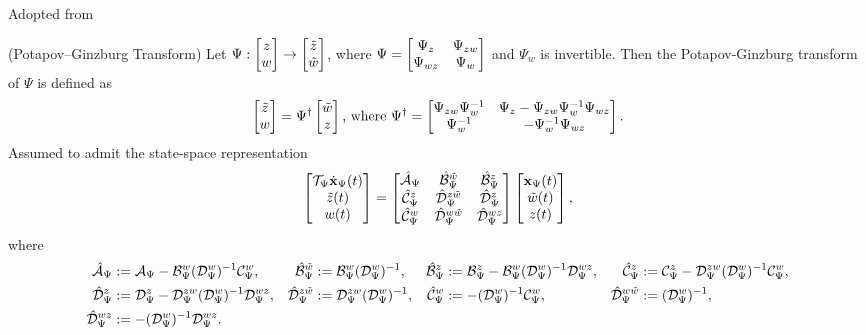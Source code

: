 Adopted from \cite{venkataraman}
\begin{definition}(Potapov--Ginzburg Transform)\label{def:pg}
    Let ${\Psi} : \begin{bmatrix}z \\ w\end{bmatrix} \to \begin{bmatrix}\tilde{z} \\ \tilde{w}\end{bmatrix}$, where $\Psi = \begin{bmatrix}\Psi_{z} & \Psi_{zw} \\ \Psi_{wz} & \Psi_{w}\end{bmatrix}$
    and $\Psi_{w}$ is invertible. Then the Potapov-Ginzburg transform of $\Psi$ is defined as
    \begin{equation}\label{eqn:pgtransform}
        \begin{bmatrix}\tilde{z} \\ w\end{bmatrix}= \Psi^\dagger \begin{bmatrix}\tilde{w} \\ z\end{bmatrix} \text{, where }\Psi^\dagger = \begin{bmatrix}\Psi_{zw}\Psi_{w}^{-1} & \Psi_{z} - \Psi_{zw}\Psi_{w}^{-1}\Psi_{wz}\\
                            \Psi_{w}^{-1} & -\Psi_{w}^{-1}\Psi_{wz}\end{bmatrix}.
    \end{equation}
    Assumed to admit the state-space representation
    \begin{equation}\label{eqn:sspgtransform}
        \begin{bmatrix}\mathcal{T}_\Psi\dot{\mathbf{x}}_\Psi(t)\\ \tilde{z}(t) \\ w(t)\end{bmatrix} = 
        \begin{bmatrix}\hat{\mathcal{A}}_\Psi & \hat{\mathcal{B}}_\Psi^{\tilde{w}} & \hat{\mathcal{B}}_\Psi^z\\
        \hat{\mathcal{C}}_\Psi^z & \hat{\mathcal{D}}_\Psi^{z\tilde{w}} & \hat{\mathcal{D}}_\Psi^z \\
        \hat{\mathcal{C}}_\Psi^w & \hat{\mathcal{D}}_\Psi^{w\tilde{w}} & \hat{\mathcal{D}}_\Psi^{wz}\end{bmatrix}\begin{bmatrix}\mathbf{x}_\Psi(t) \\ \tilde{w}(t) \\ z(t)\end{bmatrix},
    \end{equation}
    where
    \begin{align*}
        \hat{\mathcal{A}}_\Psi &:= \mathcal{A}_\Psi - \mathcal{B}_\Psi^w(\mathcal{D}_\Psi^w)^{-1}\mathcal{C}_\Psi^w, &
        \hat{\mathcal{B}}_\Psi^{\tilde{w}} &:= \mathcal{B}_\Psi^w(\mathcal{D}_\Psi^w)^{-1}, &
        \hat{\mathcal{B}}_\Psi^{z} &:= \mathcal{B}_\Psi^z - \mathcal{B}_\Psi^w(\mathcal{D}_\Psi^w)^{-1}\mathcal{D}_\Psi^{wz}, &
        \hat{\mathcal{C}}_\Psi^z &:= \mathcal{C}_\Psi^z - \mathcal{D}_\Psi^{zw}(\mathcal{D}_\Psi^w)^{-1}\mathcal{C}_\Psi^w,\\
        \hat{\mathcal{D}}_\Psi^z &:= \mathcal{D}_\Psi^z - \mathcal{D}_\Psi^{zw}(\mathcal{D}_\Psi^w)^{-1}\mathcal{D}_\Psi^{wz}, &
        \hat{\mathcal{D}}_\Psi^{z\tilde{w}} &:= \mathcal{D}_\Psi^{zw}(\mathcal{D}_\Psi^w)^{-1}, &
        \hat{\mathcal{C}}_\Psi^w &:= -(\mathcal{D}_\Psi^w)^{-1}\mathcal{C}_\Psi^w, &
        \hat{\mathcal{D}}_\Psi^{w\tilde{w}} &:= (\mathcal{D}_\Psi^w)^{-1}, \\
        \hat{\mathcal{D}}_\Psi^{wz} &:= -(\mathcal{D}_\Psi^w)^{-1}\mathcal{D}_\Psi^{wz}.
    \end{align*}
\end{definition}
